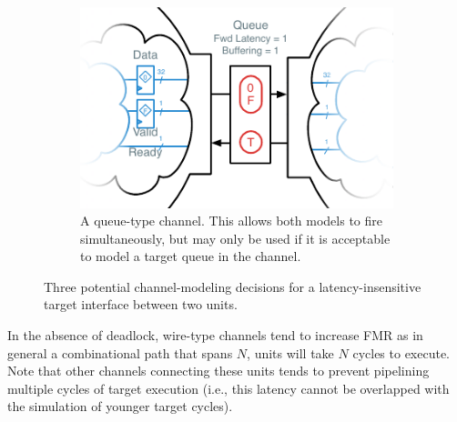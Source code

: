 \begin{figure}
\begin{subfigure}[t]{0.49\textwidth}
    \end{subfigure}
    \begin{subfigure}[t]{0.49\textwidth}
        \captionsetup{margin=0.25cm}
        \includegraphics[width=\columnwidth]{figures/li-queue-channel-manual.pdf}
        \caption{A queue-type channel. This allows both models to
        fire simultaneously, but may only be used if it is acceptable to model
        a target queue in the channel.}
    \end{subfigure}
    \centering
    \caption{Three potential channel-modeling decisions for a latency-insensitive target interface between two units.}
    \label{fig:channel-deadlock}
\end{figure}

In the absence of deadlock, wire-type channels tend to increase FMR as in
general a combinational path that spans $N$, units will take $N$ cycles to
execute. Note that other channels connecting these units tends to prevent
pipelining multiple cycles of target execution (i.e., this latency cannot be
overlapped with the simulation of younger target cycles).

